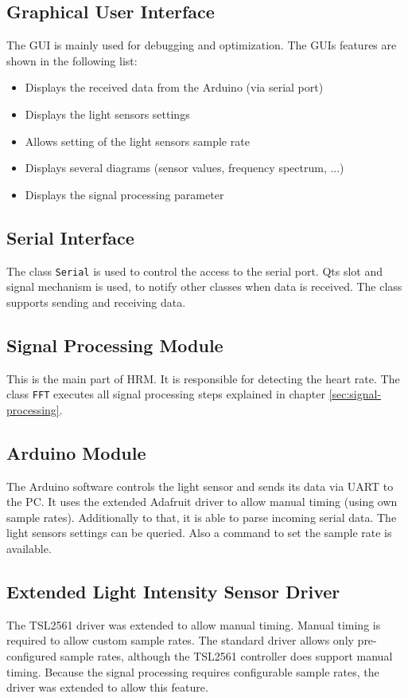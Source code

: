 \documentclass[notitlepage]{scrreprt}
\begin{document}
\subsection{Graphical User Interface}
The GUI is mainly used for debugging and optimization. The GUIs features are shown in the following list:

\begin{itemize}
	\item{Displays the received data from the Arduino (via serial port)}
	\item{Displays the light sensors settings}
	\item{Allows setting of the light sensors sample rate}
	\item{Displays several diagrams (sensor values, frequency spectrum, ...)}
	\item{Displays the signal processing parameter}
\end{itemize}

\subsection{Serial Interface}
The class \lstinline{Serial} is used to control the access to the serial port. Qts slot and signal mechanism is used, to notify other classes when data is received. The class supports sending and receiving data. 

\subsection{Signal Processing Module}
This is the main part of HRM. It is responsible for detecting the heart rate. The class \lstinline{FFT} executes all signal processing steps explained in chapter \ref{sec:signal-processing}.

\subsection{Arduino Module}
The Arduino software controls the light sensor and sends its data via UART to the PC. It uses the extended Adafruit driver to allow manual timing (using own sample rates). Additionally to that, it is able to parse incoming serial data. The light sensors settings can be queried. Also a command to set the sample rate is available.

\newpage

\subsection{Extended Light Intensity Sensor Driver}
The TSL2561 driver was extended to allow manual timing. Manual timing is required to allow custom sample rates. The standard driver allows only pre-configured sample rates, although the TSL2561 controller does support manual timing. Because the signal processing requires configurable sample rates, the driver was extended to allow this feature.\\
\end{document}
